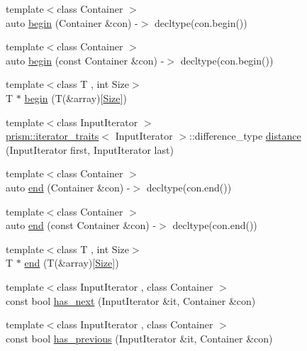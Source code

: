\begin{DoxyCompactItemize}
\item 
{\footnotesize template$<$class Container $>$ }\\auto \hyperlink{namespaceprism_a6d7a987672303bcc2aad6eedfa3c97c5}{begin} (Container \&con) -\/$>$ decltype(con.\+begin())
\item 
{\footnotesize template$<$class Container $>$ }\\auto \hyperlink{namespaceprism_a1d797e0ebd535413f23ff6c378bce541}{begin} (const Container \&con) -\/$>$ decltype(con.\+begin())
\item 
{\footnotesize template$<$class T , int Size$>$ }\\T $\ast$ \hyperlink{namespaceprism_a1fa3ae5087a69ca4b87cd0142dd7f4f4}{begin} (T(\&array)\mbox{[}\hyperlink{classprism_1_1_size}{Size}\mbox{]})
\item 
{\footnotesize template$<$class Input\+Iterator $>$ }\\\hyperlink{structprism_1_1iterator__traits}{prism\+::iterator\+\_\+traits}$<$ Input\+Iterator $>$\+::difference\+\_\+type \hyperlink{namespaceprism_ad9a8b01383d77bc9bcd878901af6f8bb}{distance} (Input\+Iterator first, Input\+Iterator last)
\item 
{\footnotesize template$<$class Container $>$ }\\auto \hyperlink{namespaceprism_acd1f6ce5ed6fe400694b77f49270ea36}{end} (Container \&con) -\/$>$ decltype(con.\+end())
\item 
{\footnotesize template$<$class Container $>$ }\\auto \hyperlink{namespaceprism_a81b99f9ade4f7bd30ab1c5a64a20d539}{end} (const Container \&con) -\/$>$ decltype(con.\+end())
\item 
{\footnotesize template$<$class T , int Size$>$ }\\T $\ast$ \hyperlink{namespaceprism_a9b7ee229aa856b527057b2abdf6cf144}{end} (T(\&array)\mbox{[}\hyperlink{classprism_1_1_size}{Size}\mbox{]})
\item 
{\footnotesize template$<$class Input\+Iterator , class Container $>$ }\\const bool \hyperlink{namespaceprism_ad56900cb33be6d15ac27a7c61bad2ce6}{has\+\_\+next} (Input\+Iterator \&it, Container \&con)
\item 
{\footnotesize template$<$class Input\+Iterator , class Container $>$ }\\const bool \hyperlink{namespaceprism_af20b814018d65b46e6d08eb450c176c9}{has\+\_\+previous} (Input\+Iterator \&it, Container \&con)
\item 

\end{DoxyCompactItemize}
